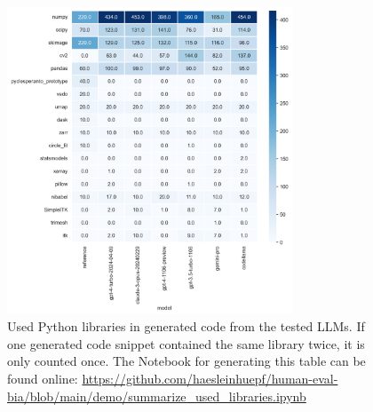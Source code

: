 \documentclass{ecai}
\begin{document}
\begin{figure}[h]
    \includegraphics[width=8.5cm]{used_libraries_heatmap.png}
    \caption{Used Python libraries in generated code from the tested LLMs. If one generated code snippet contained the same library twice, it is only counted once. The Notebook for generating this table can be found online: \url{https://github.com/haesleinhuepf/human-eval-bia/blob/main/demo/summarize_used_libraries.ipynb}
    \newline
    \newline }
    \label{fig:usedlibraries}
    \end{figure}

%
\end{document}
